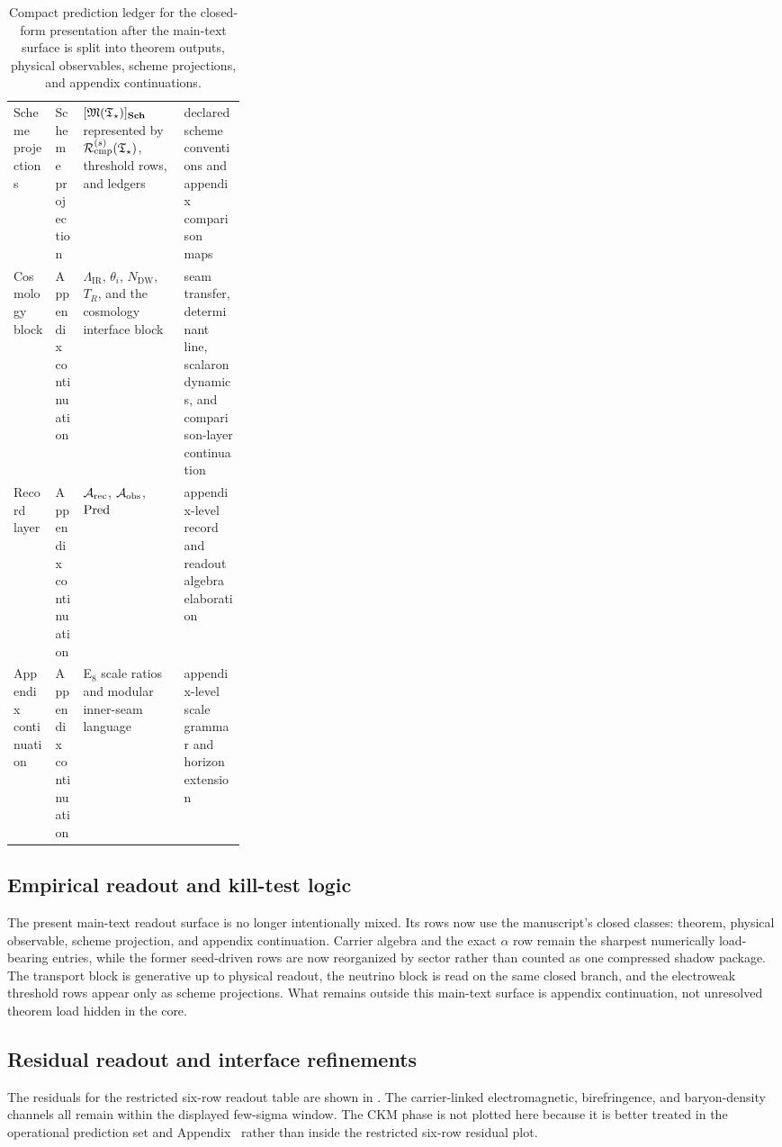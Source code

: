 \begin{table}[t]
\begin{tabularx}{\linewidth}{@{}>{\raggedright\arraybackslash}p{0.18\linewidth}>{\raggedright\arraybackslash}p{0.12\linewidth}YY@{}}
Scheme projections & Scheme projection & $[\mathfrak M(\mathfrak T_{\star})]_{\mathbf{Sch}}$ represented by $\mathcal R_{\mathrm{cmp}}^{(s)}(\mathfrak T_{\star})$, threshold rows, and ledgers & declared scheme conventions and appendix comparison maps \\
Cosmology block & Appendix continuation & $\Lambda_{\mathrm{IR}}$, $\theta_i$, $N_{\mathrm{DW}}$, $T_R$, and the cosmology interface block & seam transfer, determinant line, scalaron dynamics, and comparison-layer continuation \\
Record layer & Appendix continuation & $\mathcal A_{\mathrm{rec}}$, $\mathcal A_{\mathrm{obs}}$, $\operatorname{Pred}$ & appendix-level record and readout algebra elaboration \\
Appendix continuation & Appendix continuation & E$_8$ scale ratios and modular inner-seam language & appendix-level scale grammar and horizon extension \\
\bottomrule
\end{tabularx}
\caption{Compact prediction ledger for the closed-form presentation after the main-text surface is
split into theorem outputs, physical observables, scheme projections, and appendix continuations.}
\label{tab:prediction-ledger}
\end{table}

\subsection{Empirical readout and kill-test logic}

The present main-text readout surface is no longer intentionally mixed. Its rows now use the
manuscript's closed classes: theorem, physical observable, scheme projection, and appendix
continuation. Carrier algebra and the exact $\alpha$ row remain the sharpest numerically
load-bearing entries, while the former seed-driven rows are now reorganized by sector rather than
counted as one compressed shadow package. The transport block is generative up to physical readout,
the neutrino block is read on the same closed branch, and the electroweak threshold rows appear
only as scheme projections. What remains outside this main-text surface is appendix continuation,
not unresolved theorem load hidden in the core.

\subsection{Residual readout and interface refinements}

The residuals for the restricted six-row readout table are shown in
. The carrier-linked electromagnetic, birefringence, and baryon-density
channels all remain within the displayed few-sigma window. The CKM phase is not plotted here
because it is better treated in the operational prediction set and Appendix~
rather than inside the restricted six-row residual plot.

